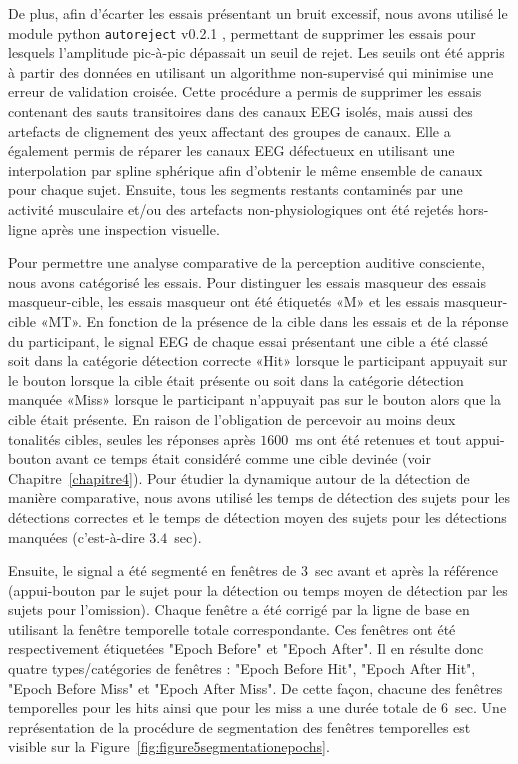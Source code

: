 De plus, afin d'écarter les essais présentant un bruit excessif, nous avons utilisé le module python \texttt{autoreject} v0.2.1 \citep{jas2016automated, jas2017autoreject}, permettant de supprimer les essais pour lesquels l'amplitude pic-à-pic dépassait un seuil de rejet. 
Les seuils ont été appris à partir des données en utilisant un algorithme non-supervisé qui minimise une erreur de validation croisée. 
Cette procédure a permis de supprimer les essais contenant des sauts transitoires dans des canaux EEG isolés, mais aussi des artefacts de clignement des yeux affectant des groupes de canaux. 
Elle a également permis de réparer les canaux EEG défectueux en utilisant une interpolation par spline sphérique afin d'obtenir le même ensemble de canaux pour chaque sujet. 
Ensuite, tous les segments restants contaminés par une activité musculaire et/ou des artefacts non-physiologiques ont été rejetés hors-ligne après une inspection visuelle.

Pour permettre une analyse comparative de la perception auditive consciente, nous avons catégorisé les essais. 
Pour distinguer les essais masqueur des essais masqueur-cible, les essais masqueur ont été étiquetés «M» et les essais masqueur-cible «MT». 
En fonction de la présence de la cible dans les essais et de la réponse du participant, le signal EEG de chaque essai présentant une cible a été classé soit dans la catégorie détection correcte «Hit» lorsque le participant appuyait sur le bouton lorsque la cible était présente ou soit dans la catégorie détection manquée «Miss» lorsque le participant n'appuyait pas sur le bouton alors que la cible était présente.
En raison de l'obligation de percevoir au moins deux tonalités cibles, seules les réponses après $1600$~ms ont été retenues et tout appui-bouton avant ce temps était considéré comme une cible devinée (voir Chapitre~\ref{chapitre4}).
Pour étudier la dynamique autour de la détection de manière comparative, nous avons utilisé les temps de détection des sujets pour les détections correctes et le temps de détection moyen des sujets pour les détections manquées (c'est-à-dire $3.4$~sec). 

Ensuite, le signal a été segmenté en fenêtres de $3$~sec avant et après la référence (appui-bouton par le sujet pour la détection ou temps moyen de détection par les sujets pour l'omission). 
Chaque fenêtre a été corrigé par la ligne de base en utilisant la fenêtre temporelle totale correspondante. 
Ces fenêtres ont été respectivement étiquetées "Epoch Before" et "Epoch After". 
Il en résulte donc quatre types/catégories de fenêtres : "Epoch Before Hit", "Epoch After Hit", "Epoch Before Miss" et "Epoch After Miss". 
De cette façon, chacune des fenêtres temporelles pour les hits ainsi que pour les miss a une durée totale de $6$~sec. 
Une représentation de la procédure de segmentation des fenêtres temporelles est visible sur la Figure~\ref{fig:figure5segmentationepochs}. 

